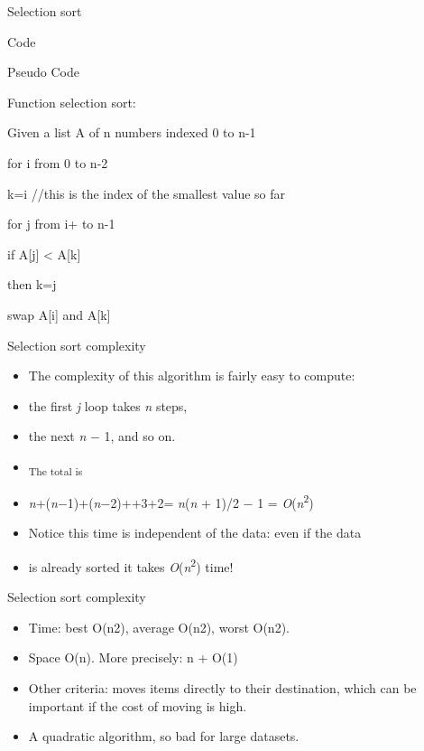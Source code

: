 \documentclass{beamer}
\begin{document}
\begin{frame}
\end{frame} \begin{frame}

Selection sort

Code 

Pseudo Code

Function selection sort:

Given a list A of n numbers indexed 0 to n-1

for i from 0 to n-2

k=i //this is the index of the smallest value so far

for j from i+ to n-1

if A[j] < A[k]

then k=j

swap A[i] and A[k]

\end{frame} \begin{frame}

Selection sort complexity

\begin{itemize}
\item The complexity of this algorithm is fairly easy to compute:
\item the first \textit{j }loop takes \textit{n }steps, 
\item the next \textit{n }$-$ 1, and so on. 
\item \textsubscript{The total is }
\item \textit{n}+(\textit{n}$-$1)+(\textit{n}$-$2)+{\textperiodcentered}{\textperiodcentered}{\textperiodcentered}+3+2=
\textit{n}(\textit{n }+ 1)/2 $-$ 1 = \textit{O}(\textit{n}\textsuperscript{2})
\item Notice this time is independent of the data: even if the data
\item is already sorted it takes \textit{O}(\textit{n}\textsuperscript{2}) time!
\end{itemize}

\end{frame} \begin{frame}

Selection sort complexity

\begin{itemize}
\item Time: best O(n2), average O(n2), worst O(n2).
\item Space O(n). More precisely: n + O(1)
\item Other criteria: moves items directly to their destination, which can be important if the cost of moving is high. 
\item A quadratic algorithm, so bad for large datasets.
\end{itemize}


\end{frame}
\end{document}
